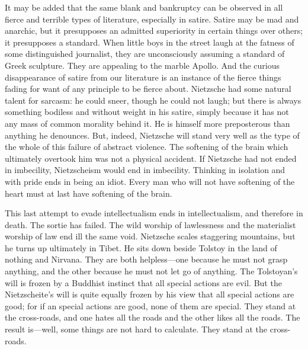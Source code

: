 \documentclass{book}
\begin{document}
It may be added that the same blank and bankruptcy can be observed in all fierce and terrible types of literature, especially in satire. Satire may be mad and anarchic, but it presupposes an admitted superiority in certain things over others; it presupposes a standard. When little boys in the street laugh at the fatness of some distinguished journalist, they are unconsciously assuming a standard of Greek sculpture. They are appealing to the marble Apollo. And the curious disappearance of satire from our literature is an instance of the fierce things fading for want of any principle to be fierce about. Nietzsche had some natural talent for sarcasm: he could sneer, though he could not laugh; but there is always something bodiless and without weight in his satire, simply because it has not any mass of common morality behind it. He is himself more preposterous than anything he denounces. But, indeed, Nietzsche will stand very well as the type of the whole of this failure of abstract violence. The softening of the brain which ultimately overtook him was not a physical accident. If Nietzsche had not ended in imbecility, Nietzscheism would end in imbecility. Thinking in isolation and with pride ends in being an idiot. Every man who will not have softening of the heart must at last have softening of the brain.

This last attempt to evade intellectualism ends in intellectualism, and therefore in death. The sortie has failed. The wild worship of lawlessness and the materialist worship of law end ill the same void. Nietzsche scales staggering mountains, but he turns up ultimately in Tibet. He sits down beside Tolstoy in the land of nothing and Nirvana. They are both helpless—one because he must not grasp anything, and the other because he must not let go of anything. The Tolstoyan’s will is frozen by a Buddhist instinct that all special actions are evil. But the Nietzscheite’s will is quite equally frozen by his view that all special actions are good; for if an special actions are good, none of them are special. They stand at the cross-roads, and one hates all the roads and the other likes all the roads. The result is—well, some things are not hard to calculate. They stand at the cross-roads.
\end{document}
